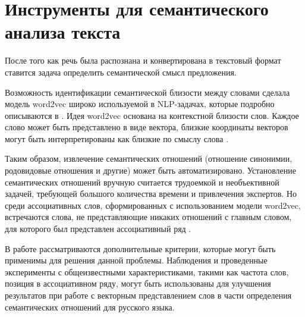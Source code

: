 
\section{Инструменты для семантического анализа текста}

После того как речь была распознана и конвертирована в текстовый формат ставится задача определить
семантической смысл предложения.  

Возможность идентификации семантической близости между словами сделала модель word2vec широко используемой в NLP-задачах, которые подробно описываются в \cite{neural05}. 
Идея word2vec основана на контекстной близости слов. Каждое слово может быть представлено в виде вектора, 
близкие координаты векторов могут быть интерпретированы как близкие по смыслу слова \cite{seman04}. 

Таким образом, извлечение семантических отношений (отношение синонимии, родовидовые отношения и другие) может быть автоматизировано. 
Установление семантических отношений вручную считается трудоемкой и необъективной задачей, требующей большого количества времени и 
привлечения экспертов. Но среди ассоциативных слов, сформированных с использованием модели word2vec, встречаются слова, не 
представляющие никаких отношений с главным словом, для которого был представлен ассоциативный ряд \cite{seman03}.

В работе рассматриваются дополнительные критерии, которые могут быть применимы для решения данной проблемы. Наблюдения и проведенные 
эксперименты с общеизвестными характеристиками, такими как частота слов, позиция в ассоциативном ряду, могут быть использованы для 
улучшения результатов при работе с векторным представлением слов в части определения семантических отношений для русского языка. 

